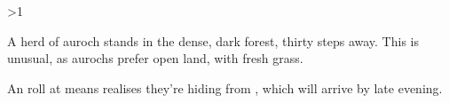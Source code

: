 \ifnum\value{temperature}>1
\else
\fi

A herd of auroch stands in the dense, dark forest, thirty \glspl{step} away.
This is unusual, as aurochs prefer open land, with fresh grass.

An  roll at \tn[10] means  realises they're hiding from , which will arrive by late evening.

\auroch
